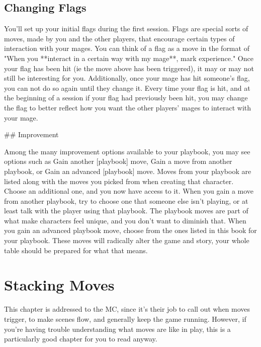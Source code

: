 \documentclass[
  oneside,
  statementpaper,
  9pt]{memoir}
\begin{document}
\hypertarget{changing-flags}{%
\section{Changing Flags}\label{changing-flags}}

\begin{Player}

You’ll set up your initial flags during the first session. Flags are special sorts of moves, made by you and the other players, that encourage certain types of interaction with your mages. You can think of a flag as a move in the format of "When you **interact in a certain way with my mage**, mark experience." Once your flag has been hit (ie the move above has been triggered), it may or may not still be interesting for you. Additionally, once your mage has hit someone’s flag, you can not do so again until they change it. Every time your flag is hit, and at the beginning of a session if your flag had previously been hit, you may change the flag to better reflect how you want the other players’ mages to interact with your mage.

## Improvement

Among the many improvement options available to your playbook, you may see options such as Gain another [playbook] move, Gain a move from another playbook, or Gain an advanced [playbook] move. Moves from your playbook are listed along with the moves you picked from when creating that character. Choose an additional one, and you now have access to it. When you gain a move from another playbook, try to choose one that someone else isn’t playing, or at least talk with the player using that playbook. The playbook moves are part of what make characters feel unique, and you don’t want to diminish that. When you gain an advanced playbook move, choose from the ones listed in this book for your playbook. These moves will radically alter the game and story, your whole table should be prepared for what that means.

\end{Player}

\newpage

\hypertarget{stacking-moves}{%
\chapter{Stacking Moves}\label{stacking-moves}}

\begin{Player}

This chapter is addressed to the MC, since it's their job to call out when moves trigger, to make scenes flow, and generally keep the game running. However, if you're having trouble understanding what moves are like in play, this is a particularly good chapter for you to read anyway.

\end{Player}
\end{document}
